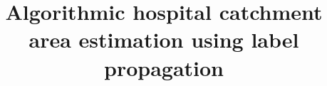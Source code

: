 \documentclass[twocolumn]{bmcart}%
\begin{document}
\begin{frontmatter}

\begin{fmbox}


\title{Algorithmic hospital catchment area estimation using label propagation}


\author[
  addressref={aff1,aff2},
  corref={aff1},
  email={rc538@exeter.ac.uk}
]{  }
\author[
  addressref={aff3,aff4},
  email={g.griffith@bristol.ac.uk}
]{  }
\author[
  addressref={aff5,aff6},
  email={lucas@ifisc.uib-csic.es}
]{  }
\author[
  addressref={aff1,aff7,aff8},
  email={k.tsaneva-atanasova@exeter.ac.uk}
]{  }




\end{fmbox}
\end{frontmatter}
\end{document}
